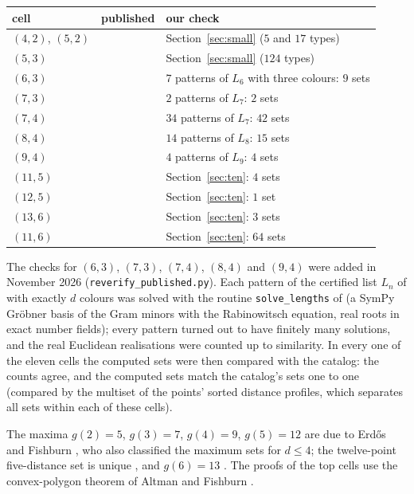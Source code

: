 \documentclass[11pt]{amsart}
\theoremstyle{remark}
\begin{document}
\begin{center}
\begin{tabular}{@{}llp{}@{}}
\toprule
cell & published & our check\\
\midrule
$(4,2)$, $(5,2)$ & \cite{ES} & Section~\ref{sec:small} ($5$ and $17$ types)\\
$(5,3)$ & \cite[Thm.~1]{Sh04} & Section~\ref{sec:small} ($124$ types)\\
$(6,3)$ & \cite[Thm.~2]{Sh04} & $7$ patterns of $L_6$ with three colours: $9$ sets\\
$(7,3)$ & \cite{EF,Sh04} & $2$ patterns of $L_7$: $2$ sets\\
$(7,4)$ & \cite[Thm.~8]{LW} & $34$ patterns of $L_7$: $42$ sets\\
$(8,4)$ & \cite[Thm.~1.2]{Sh08} & $14$ patterns of $L_8$: $15$ sets\\
$(9,4)$ & \cite{EF} & $4$ patterns of $L_9$: $4$ sets\\
$(11,5)$ & \cite[Thm.~13]{W11} & Section~\ref{sec:ten}: $4$ sets\\
$(12,5)$ & \cite{EF,Sh08} & Section~\ref{sec:ten}: $1$ set\\
$(13,6)$ & \cite{W12,SO} & Section~\ref{sec:ten}: $3$ sets\\
$(11,6)$ & \cite[Lemma~6]{AA} & Section~\ref{sec:ten}: $64$ sets\\
\bottomrule
\end{tabular}
\end{center}

The checks for $(6,3)$, $(7,3)$, $(7,4)$, $(8,4)$ and $(9,4)$ were added in November 2026
(\texttt{reverify\_published.py}). Each pattern of the certified list $L_n$ of \cite{AC} with exactly $d$
colours was solved with the routine \texttt{solve\_lengths} of \cite{AC} (a SymPy Gröbner basis of the Gram
minors with the Rabinowitsch equation, real roots in exact number fields); every pattern turned out to have
finitely many solutions, and the real Euclidean realisations were counted up to similarity. In every one of
the eleven cells the computed sets were then compared with the catalog: the counts agree, and the computed
sets match the catalog's sets one to one (compared by the multiset of the points' sorted distance profiles,
which separates all sets within each of these cells).

The maxima $g(2)=5$, $g(3)=7$, $g(4)=9$, $g(5)=12$ are due to Erdős and Fishburn \cite{EF}, who also
classified the maximum sets for $d\le4$; the twelve-point five-distance set is unique \cite{Sh08}, and
$g(6)=13$ \cite{W12}. The proofs of the top cells use the convex-polygon theorem of Altman and Fishburn
\cite{Al,Fi}.
\end{document}
